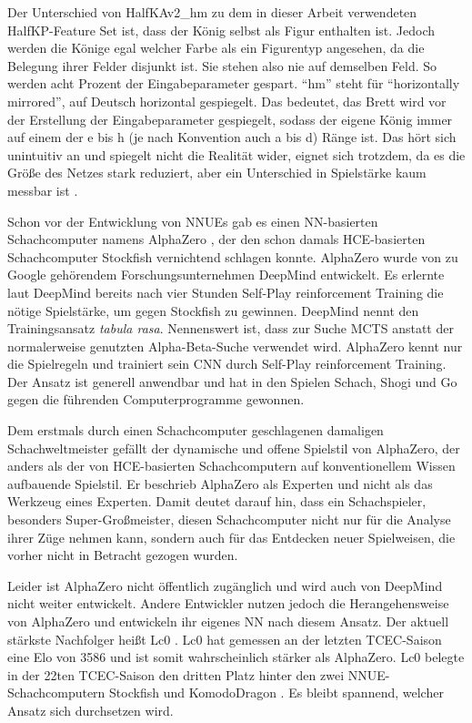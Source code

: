 Der Unterschied von HalfKAv2\_hm zu dem in dieser Arbeit verwendeten HalfKP-Feature Set ist, dass der König selbst als Figur enthalten ist. Jedoch werden die Könige egal welcher Farbe als ein Figurentyp angesehen, da die Belegung ihrer Felder disjunkt ist. Sie stehen also nie auf demselben Feld. So werden acht Prozent der Eingabeparameter gespart. \enquote{hm} steht für \enquote{horizontally mirrored}, auf Deutsch horizontal gespiegelt. Das bedeutet, das Brett wird vor der Erstellung der Eingabeparameter gespiegelt, sodass der eigene König immer auf einem der e bis h (je nach Konvention auch a bis d) Ränge ist. Das hört sich unintuitiv an und spiegelt nicht die Realität wider, eignet sich trotzdem, da es die Größe des Netzes stark reduziert, aber ein Unterschied in Spielstärke kaum messbar ist \cite{StockfishNNUE}.

Schon vor der Entwicklung von \acp{NNUE} gab es einen \ac{NN}-basierten Schachcomputer namens AlphaZero \cite{Silver2017}, der den schon damals \ac{HCE}-basierten Schachcomputer Stockfish vernichtend schlagen konnte. AlphaZero wurde \citeyear{Silver2017} von zu Google gehörendem Forschungsunternehmen DeepMind entwickelt. Es erlernte laut DeepMind bereits nach vier Stunden Self-Play reinforcement Training die nötige Spielstärke, um gegen Stockfish zu gewinnen. DeepMind nennt den Trainingsansatz \emph{tabula rasa}. Nennenswert ist, dass zur Suche \ac{MCTS} anstatt der normalerweise genutzten Alpha-Beta-Suche verwendet wird. AlphaZero kennt nur die Spielregeln und trainiert sein \ac{CNN} durch Self-Play reinforcement Training. Der Ansatz ist generell anwendbar und hat in den Spielen Schach, Shogi und Go gegen die führenden Computerprogramme gewonnen.

Dem erstmals durch einen Schachcomputer geschlagenen damaligen Schachweltmeister \citeauthor{Kasparov2018} \cite{Kasparov2018} gefällt der dynamische und offene Spielstil von AlphaZero, der anders als der von \ac{HCE}-basierten Schachcomputern auf konventionellem Wissen aufbauende Spielstil. Er beschrieb AlphaZero als Experten und nicht als das Werkzeug eines Experten. Damit deutet \citeauthor{Kasparov2018} darauf hin, dass ein Schachspieler, besonders Super-Großmeister, diesen Schachcomputer nicht nur für die Analyse ihrer Züge nehmen kann, sondern auch für das Entdecken neuer Spielweisen, die vorher nicht in Betracht gezogen wurden.

Leider ist AlphaZero nicht öffentlich zugänglich und wird auch von DeepMind nicht weiter entwickelt. Andere Entwickler nutzen jedoch die Herangehensweise von AlphaZero und entwickeln ihr eigenes \ac{NN} nach diesem Ansatz. Der aktuell stärkste Nachfolger heißt \ac{Lc0} \cite{Lc0Homepage}. \ac{Lc0} hat gemessen an der letzten \ac{TCEC}-Saison eine Elo von 3586 \cite{TCEC22} und ist somit wahrscheinlich stärker als AlphaZero. \ac{Lc0} belegte in der 22ten \ac{TCEC}-Saison den dritten Platz hinter den zwei \ac{NNUE}-Schachcomputern Stockfish und KomodoDragon \cite{KomodoDragon}. Es bleibt spannend, welcher Ansatz sich durchsetzen wird.